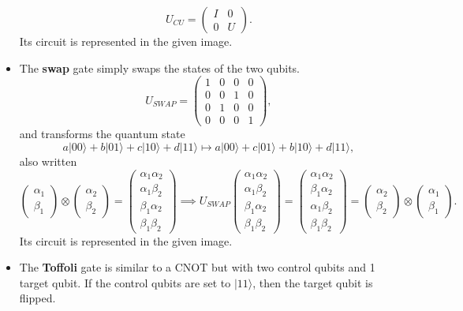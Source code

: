\documentclass{article}
\theoremstyle{definition}
\begin{document}
\begin{itemize}
    \[U_{CU} = \begin{pmatrix} I & 0 \\ 0 & U \end{pmatrix}.\]
    Its circuit is represented in the given image.
  \item The \textbf{swap} gate simply swaps the states of the two qubits.
    \[U_{SWAP} = \begin{pmatrix} 1&0&0&0\\0&0&1&0\\0&1&0&0\\0&0&0&1 \end{pmatrix},\]
    and transforms the quantum state
    \[a |00\rangle + b |01\rangle + c|10\rangle + d|11\rangle \mapsto a |00\rangle + c |01\rangle + b|10\rangle + d|11\rangle,\]
    also written
    \[\begin{pmatrix} \alpha_1 \\ \beta_1 \end{pmatrix} \otimes \begin{pmatrix} \alpha_2 \\ \beta_2 \end{pmatrix} = \begin{pmatrix} \alpha_1 \alpha_2 \\ \alpha_1 \beta_2 \\ \beta_1 \alpha_2 \\ \beta_1 \beta_2 \end{pmatrix} \implies U_{SWAP} \begin{pmatrix} \alpha_1 \alpha_2 \\ \alpha_1 \beta_2 \\ \beta_1 \alpha_2 \\ \beta_1 \beta_2 \end{pmatrix} = \begin{pmatrix} \alpha_1 \alpha_2 \\ \beta_1 \alpha_2 \\ \alpha_1 \beta_2 \\ \beta_1 \beta_2 \end{pmatrix} = \begin{pmatrix} \alpha_2 \\ \beta_2 \end{pmatrix} \otimes \begin{pmatrix} \alpha_1 \\ \beta_1 \end{pmatrix}.\]
    Its circuit is represented in the given image.
  \item The \textbf{Toffoli} gate is similar to a CNOT but with two control qubits and 1 target qubit. If the control qubits are set to $|11\rangle$, then the target qubit is flipped.

\end{itemize}
\end{document}
